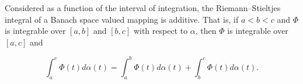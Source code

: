 Considered as a function of the interval of integration, the Riemann–Stieltjes integral of a Banach space valued mapping is additive. That is, if $a < b < c$ and $\Phi$ is integrable over $[a, b]$ and $[b, c]$ with respect to $\alpha$, then $\Phi$ is integrable over $[a, c]$ and

$$\int_a^c \Phi(t) d\alpha(t) = \int_a^b \Phi(t) d\alpha(t) + \int_b^c \Phi(t) d\alpha(t).$$
